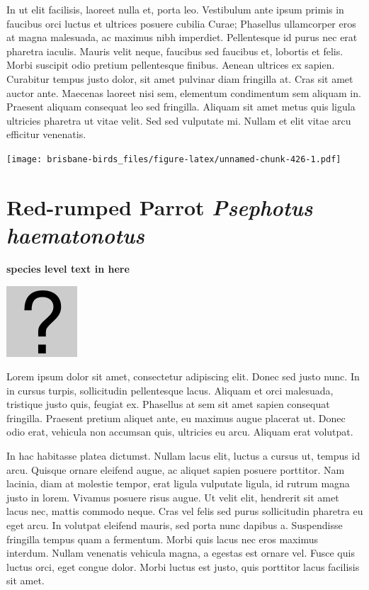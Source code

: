 \documentclass[]{book}
\let\origfigure\figure
\let\endorigfigure\endfigure
\renewenvironment{figure}[1][2] {
  \expandafter\origfigure\expandafter[H]
} {
  \endorigfigure
}
\begin{document}
In ut elit facilisis, laoreet nulla et, porta leo. Vestibulum ante ipsum
primis in faucibus orci luctus et ultrices posuere cubilia Curae;
Phasellus ullamcorper eros at magna malesuada, ac maximus nibh
imperdiet. Pellentesque id purus nec erat pharetra iaculis. Mauris velit
neque, faucibus sed faucibus et, lobortis et felis. Morbi suscipit odio
pretium pellentesque finibus. Aenean ultrices ex sapien. Curabitur
tempus justo dolor, sit amet pulvinar diam fringilla at. Cras sit amet
auctor ante. Maecenas laoreet nisi sem, elementum condimentum sem
aliquam in. Praesent aliquam consequat leo sed fringilla. Aliquam sit
amet metus quis ligula ultricies pharetra ut vitae velit. Sed sed
vulputate mi. Nullam et elit vitae arcu efficitur venenatis.

\begin{figure}
\centering
\texttt{[image: brisbane-birds\_files/figure-latex/unnamed-chunk-426-1.pdf]}
\caption{\label{fig:unnamed-chunk-426}insert figure caption}
\end{figure}

\section{\texorpdfstring{Red-rumped Parrot \emph{Psephotus
haematonotus}}{Red-rumped Parrot Psephotus haematonotus}}\label{red-rumped-parrot-psephotus-haematonotus}

\textbf{species level text in here}

\begin{figure}
\centering
\includegraphics{assets/missing.png}
\caption{No image for species}
\end{figure}

Lorem ipsum dolor sit amet, consectetur adipiscing elit. Donec sed justo
nunc. In in cursus turpis, sollicitudin pellentesque lacus. Aliquam et
orci malesuada, tristique justo quis, feugiat ex. Phasellus at sem sit
amet sapien consequat fringilla. Praesent pretium aliquet ante, eu
maximus augue placerat ut. Donec odio erat, vehicula non accumsan quis,
ultricies eu arcu. Aliquam erat volutpat.

In hac habitasse platea dictumst. Nullam lacus elit, luctus a cursus ut,
tempus id arcu. Quisque ornare eleifend augue, ac aliquet sapien posuere
porttitor. Nam lacinia, diam at molestie tempor, erat ligula vulputate
ligula, id rutrum magna justo in lorem. Vivamus posuere risus augue. Ut
velit elit, hendrerit sit amet lacus nec, mattis commodo neque. Cras vel
felis sed purus sollicitudin pharetra eu eget arcu. In volutpat eleifend
mauris, sed porta nunc dapibus a. Suspendisse fringilla tempus quam a
fermentum. Morbi quis lacus nec eros maximus interdum. Nullam venenatis
vehicula magna, a egestas est ornare vel. Fusce quis luctus orci, eget
congue dolor. Morbi luctus est justo, quis porttitor lacus facilisis sit
amet.
\end{document}
